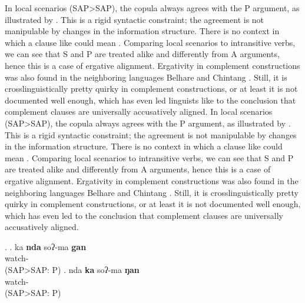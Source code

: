 In local scenarios (SAP>SAP), the copula always agrees with the P argument, as illustrated by \Next. This is a rigid syntactic constraint; the agreement is not manipulable by changes in the information structure. There is no context in which a clause like \Next[a] could mean . Comparing local scenarios to intransitive verbs, we can see that S and P are treated alike and differently from  A arguments, hence this is a case of ergative alignment. Ergativity in complement constructions was also found in the neighboring languages Belhare \citep{Bickel2004Hidden, Bickeletal2001Syntactic} and Chintang \citep{Bickeletal2010Ditransitives}. Still, it is crosslinguistically pretty quirky in complement constructions, or at least it is not documented well enough, which has even led linguists like \citet[135]{Dixon1994Ergativity}  to the conclusion that complement clauses are universally accusatively aligned. 
In local scenarios (SAP>SAP), the copula always agrees with the P argument, as illustrated by \Next. This is a rigid syntactic constraint; the agreement is not manipulable by changes in the information structure. There is no context in which a clause like \Next[a] could mean . Comparing local scenarios to intransitive verbs, we can see that S and P are treated alike and differently from  A arguments, hence this is a case of ergative alignment. Ergativity in complement constructions was also found in the neighboring languages Belhare \citep{Bickel2004Hidden, Bickeletal2001Syntactic} and Chintang \citep{Bickeletal2010Ditransitives}. Still, it is crosslinguistically pretty quirky in complement constructions, or at least it is not documented well enough, which has even led \citet[135]{Dixon1994Ergativity}  to the conclusion that complement clauses are universally accusatively aligned. 


\ex. \ag. ka {\bf nda} soʔ-ma {\bf gan}\\
  watch- \\
	(SAP>SAP: P)
\bg. nda {\bf ka} soʔ-ma {\bf ŋan}\\
    watch- \\
	(SAP>SAP: P) 



